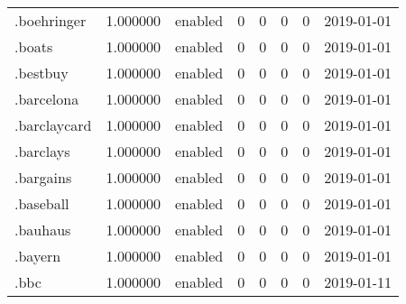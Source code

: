 \begin{tabular}{lrlrrrrl}
.boehringer               &          1.000000 &         enabled &                           0 &                           0 &                           0 &                   0 &           2019-01-01 \\
.boats                    &          1.000000 &         enabled &                           0 &                           0 &                           0 &                   0 &           2019-01-01 \\
.bestbuy                  &          1.000000 &         enabled &                           0 &                           0 &                           0 &                   0 &           2019-01-01 \\
.barcelona                &          1.000000 &         enabled &                           0 &                           0 &                           0 &                   0 &           2019-01-01 \\
.barclaycard              &          1.000000 &         enabled &                           0 &                           0 &                           0 &                   0 &           2019-01-01 \\
.barclays                 &          1.000000 &         enabled &                           0 &                           0 &                           0 &                   0 &           2019-01-01 \\
.bargains                 &          1.000000 &         enabled &                           0 &                           0 &                           0 &                   0 &           2019-01-01 \\
.baseball                 &          1.000000 &         enabled &                           0 &                           0 &                           0 &                   0 &           2019-01-01 \\
.bauhaus                  &          1.000000 &         enabled &                           0 &                           0 &                           0 &                   0 &           2019-01-01 \\
.bayern                   &          1.000000 &         enabled &                           0 &                           0 &                           0 &                   0 &           2019-01-01 \\
.bbc                      &          1.000000 &         enabled &                           0 &                           0 &                           0 &                   0 &           2019-01-11 \\

\end{tabular}
